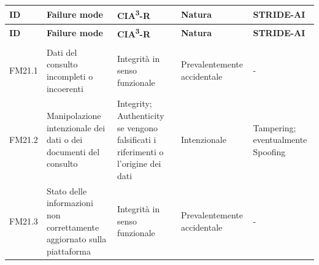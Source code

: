 {
\small
{}
\setlength{\tabcolsep}{4pt}
\renewcommand{\arraystretch}{1.08}

\begin{xltabular}{\textwidth}{
    >{\raggedright\arraybackslash}p{1.35cm}
    X
    >{\raggedright\arraybackslash}p{3.5cm}
    >{\raggedright\arraybackslash}p{2.7cm}
    >{\raggedright\arraybackslash}p{2.4cm}
}

\toprule

\textbf{ID} &
\textbf{Failure mode} &
\textbf{CIA\textsuperscript{3}-R} &
\textbf{Natura} &
\textbf{STRIDE-AI} \\

\midrule

\endfirsthead

\toprule

\textbf{ID} &
\textbf{Failure mode} &
\textbf{CIA\textsuperscript{3}-R} &
\textbf{Natura} &
\textbf{STRIDE-AI} \\

\midrule

\endhead

 \\
\endfoot

\endlastfoot


FM21.1 &

Dati del consulto incompleti o incoerenti &

Integrità in senso funzionale &

Prevalentemente accidentale &

- \\

\midrule


FM21.2 &

Manipolazione intenzionale dei dati o dei documenti del consulto &

Integrity; Authenticity se vengono falsificati i riferimenti o l'origine dei dati &

Intenzionale &

Tampering; eventualmente Spoofing \\

\midrule


FM21.3 &

Stato delle informazioni non correttamente aggiornato sulla piattaforma &

Integrità in senso funzionale &

Prevalentemente accidentale &

- \\


\end{xltabular}}
